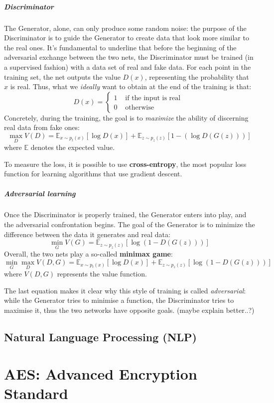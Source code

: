 \documentclass[12pt,a4paper]{book}
\theoremstyle{definition}
\begin{document}
	\paragraph{Discriminator}
	The Generator, alone, can only produce some random noise: the purpose of the Discriminator is to guide the Generator to create data that look more similar to the real ones. It's fundamental to underline that before the beginning of the adversarial exchange between the two nets, the Discriminator must be trained (in a supervised fashion) with a data set of real and fake data.
	For each point in the training set, the net outputs the value $D(x)$, representing the probability that $x$ is real. Thus, what we \textit{ideally} want to obtain at the end of the training is that:
	\[
	D(x) = \begin{cases}
		1 &\text{ if the input is real }\\
		0 & \text{ otherwise }
	\end{cases}
	\]
	Concretely, during the training, the goal is to \textit{maximize} the ability of discerning real data from fake ones:
	\[
	\max_D V(D) = \mathbb{E}_{x\sim p_t(x)}[\log D(x)] + \mathbb{E}_{z\sim p_z(z)}[1-(\log D(G(z)))]
	\]
	where $\mathbb{E}$ denotes the expected value.
	
	To measure the loss, it is possible to use \textbf{cross-entropy}, the most popular loss function for learning algorithms that use gradient descent.
	\paragraph{Adversarial learning}
	Once the Discriminator is properly trained, the Generator enters into play, and the adversarial confrontation begins. The goal of the Generator is to minimize the difference between the data it generates and real data:
	\[
	\min_G V(G) = \mathbb{E}_{z\sim p_z(z)}[\log(1-D(G(z)))]
	\]
	Overall, the two nets play a so-called \textbf{minimax game}:
	\[
	\min_G \max_D V(D,G) = \mathbb{E}_{x\sim p_t(x)}[\log D(x)] + \mathbb{E}_{z\sim p_z(z)}[\log (1-D(G(z)))]
	\]
	where $V(D,G)$ represents the value function.
	
	The last equation makes it clear why this style of training is called \textit{adversarial}: while the Generator tries to minimise a function, the Discriminator tries to maximise it, thus the two networks have opposite goals. (maybe explain better..?)
	
	\section{Natural Language Processing (NLP)}
	\chapter{AES: Advanced Encryption Standard}\label{appendix:aes}
	
	{}
	
\end{document}
